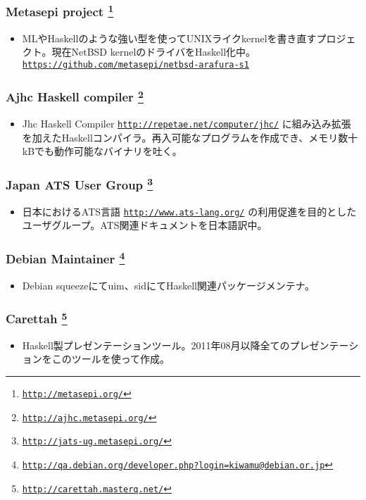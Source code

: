 \documentclass[letterpaper]{article}
\begin{document}
\subsubsection*{Metasepi project \footnote{\href{http://metasepi.org/}{\tt http://metasepi.org/}}}
\begin{itemize}
\item MLやHaskellのような強い型を使ってUNIXライクkernelを書き直すプロジェクト。現在NetBSD kernelのドライバをHaskell化中。 \href{https://github.com/metasepi/netbsd-arafura-s1}{\tt https://github.com/metasepi/netbsd-arafura-s1}
\end{itemize}

\subsubsection*{Ajhc Haskell compiler \footnote{\href{http://ajhc.metasepi.org/}{\tt http://ajhc.metasepi.org/}}}
\begin{itemize}
\item Jhc Haskell Compiler \href{http://repetae.net/computer/jhc/}{\tt http://repetae.net/computer/jhc/} に組み込み拡張を加えたHaskellコンパイラ。再入可能なプログラムを作成でき、メモリ数十kBでも動作可能なバイナリを吐く。
\end{itemize}

\subsubsection*{Japan ATS User Group \footnote{\href{http://jats-ug.metasepi.org/}{\tt http://jats-ug.metasepi.org/}}}
\begin{itemize}
\item 日本におけるATS言語 \href{http://www.ats-lang.org/}{\tt http://www.ats-lang.org/} の利用促進を目的としたユーザグループ。ATS関連ドキュメントを日本語訳中。
\end{itemize}

\subsubsection*{Debian Maintainer \footnote{\href{http://qa.debian.org/developer.php?login=kiwamu@debian.or.jp}{\tt http://qa.debian.org/developer.php?login=kiwamu@debian.or.jp}}}
\begin{itemize}
\item Debian squeezeにてuim、sidにてHaskell関連パッケージメンテナ。
\end{itemize}

\subsubsection*{Carettah \footnote{\href{http://carettah.masterq.net/}{\tt http://carettah.masterq.net/}}}
\begin{itemize}
\item Haskell製プレゼンテーションツール。2011年08月以降全てのプレゼンテーションをこのツールを使って作成。
\end{itemize}
\end{document}
